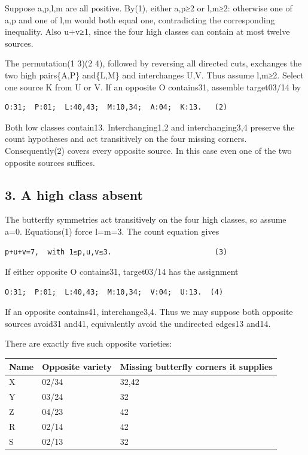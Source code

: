 \documentclass[
  10pt,
]{article}
\begin{document}
Suppose a,p,l,m are all positive. By(1), either a,p≥2 or l,m≥2:
otherwise one of a,p and one of l,m would both equal one, contradicting
the corresponding inequality. Also u+v≥1, since the four high classes
can contain at most twelve sources.

The permutation(1 3)(2 4), followed by reversing all directed cuts,
exchanges the two high pairs\{A,P\} and\{L,M\} and interchanges U,V.
Thus assume l,m≥2. Select one source K from U or V. If an opposite O
contains31, assemble target03/14 by

\begin{verbatim}
O:31;  P:01;  L:40,43;  M:10,34;  A:04;  K:13.   (2)
\end{verbatim}

Both low classes contain13. Interchanging1,2 and interchanging3,4
preserve the count hypotheses and act transitively on the four missing
corners. Consequently(2) covers every opposite source. In this case even
one of the two opposite sources suffices.

\hypertarget{a-high-class-absent}{%
\subsection*{3. A high class absent}\label{a-high-class-absent}}

The butterfly symmetries act transitively on the four high classes, so
assume a=0. Equations(1) force l=m=3. The count equation gives

\begin{verbatim}
p+u+v=7,  with 1≤p,u,v≤3.                        (3)
\end{verbatim}

If either opposite O contains31, target03/14 has the assignment

\begin{verbatim}
O:31;  P:01;  L:40,43;  M:10,34;  V:04;  U:13.  (4)
\end{verbatim}

If an opposite contains41, interchange3,4. Thus we may suppose both
opposite sources avoid31 and41, equivalently avoid the undirected
edges13 and14.

There are exactly five such opposite varieties:

\begin{longtable}[]{@{}lll@{}}
\toprule\noalign{}
Name & Opposite variety & Missing butterfly corners it supplies \\
\midrule\noalign{}
\endhead
\bottomrule\noalign{}
\endlastfoot
X & 02/34 & 32,42 \\
Y & 03/24 & 32 \\
Z & 04/23 & 42 \\
R & 02/14 & 42 \\
S & 02/13 & 32 \\
\end{longtable}
\end{document}

